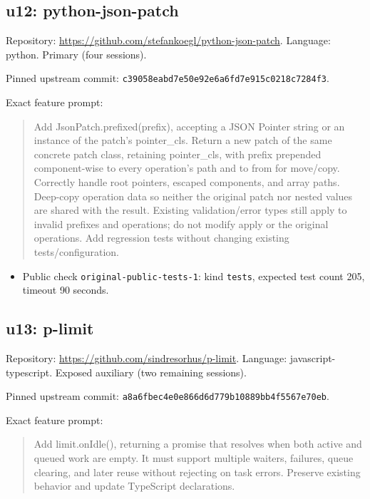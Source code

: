 \documentclass[manuscript,screen,nonacm]{acmart}
\providecommand{\tightlist}{\setlength{\itemsep}{0pt}\setlength{\parskip}{0pt}}
\begin{document}
\subsection{u12: python-json-patch}\label{u12-python-json-patch}

Repository: \url{https://github.com/stefankoegl/python-json-patch}.
Language: python. Primary (four sessions).

Pinned upstream commit:
\nolinkurl{c39058eabd7e50e92e6a6fd7e915c0218c7284f3}.

Exact feature prompt:

\begin{quote}
Add JsonPatch.prefixed(prefix), accepting a JSON Pointer string or an
instance of the patch's pointer\_cls. Return a new patch of the same
concrete patch class, retaining pointer\_cls, with prefix prepended
component-wise to every operation's path and to from for move/copy.
Correctly handle root pointers, escaped components, and array paths.
Deep-copy operation data so neither the original patch nor nested values
are shared with the result. Existing validation/error types still apply
to invalid prefixes and operations; do not modify apply or the original
operations. Add regression tests without changing existing
tests/configuration.
\end{quote}

\begin{itemize}
\tightlist
\item
  Public check \nolinkurl{original-public-tests-1}: kind \texttt{tests},
  expected test count 205, timeout 90 seconds.
\end{itemize}

\subsection{u13: p-limit}\label{u13-p-limit}

Repository: \url{https://github.com/sindresorhus/p-limit}. Language:
javascript-typescript. Exposed auxiliary (two remaining sessions).

Pinned upstream commit:
\nolinkurl{a8a6fbec4e0e866d6d779b10889bb4f5567e70eb}.

Exact feature prompt:

\begin{quote}
Add limit.onIdle(), returning a promise that resolves when both active
and queued work are empty. It must support multiple waiters, failures,
queue clearing, and later reuse without rejecting on task errors.
Preserve existing behavior and update TypeScript declarations.
\end{quote}
\end{document}
